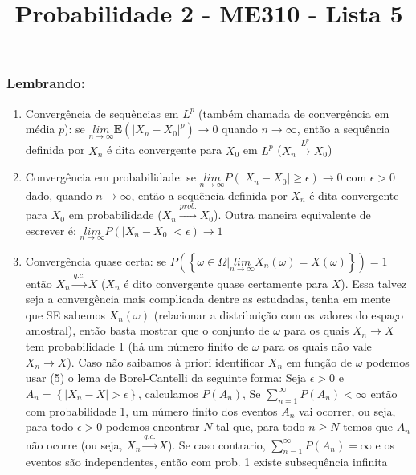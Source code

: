 \documentclass[portuguese]{article}
\begin{document}
\title{Probabilidade 2 - ME310 - Lista 5}

\maketitle

\subsubsection*{Lembrando:}
\begin{enumerate}
\item Convergência de sequências em $L^{p}$ (também chamada de convergência
em média $p$): se $\underset{n\rightarrow\infty}{lim}\mathbf{E}(\left|X_{n}-X_{0}\right|^{p})\rightarrow0$
quando $n\rightarrow\infty$, então a sequência definida por $X_{n}$
é dita convergente para $X_{0}$ em $L^{p}$ ($X_{n}\overset{L^{p}}{\rightarrow}X_{0}$)
\item Convergência em probabilidade: se $\underset{n\rightarrow\infty}{lim}P(\left|X_{n}-X_{0}\right|\ge\epsilon)\rightarrow0$
com $\epsilon>0$ dado, quando $n\rightarrow\infty$, então a sequência
definida por $X_{n}$ é dita convergente para $X_{0}$ em probabilidade
($X_{n}\overset{prob.}{\rightarrow}X_{0}$). Outra maneira equivalente
de escrever é: $\underset{n\rightarrow\infty}{lim}P(\left|X_{n}-X_{0}\right|<\epsilon)\rightarrow1$
\item Convergência quase certa: se $P(\left\{ \omega\in\Omega|\underset{n\rightarrow\infty}{lim}X_{n}\left(\omega\right)=X\left(\omega\right)\right\} )=1$
então $X_{n}\overset{q.c.}{\rightarrow}X$ ($X_{n}$ é dito convergente
quase certamente para $X$). Essa talvez seja a convergência mais
complicada dentre as estudadas, tenha em mente que SE sabemos $X_{n}(\omega)$
(relacionar a distribuição com os valores do espaço amostral), então
basta mostrar que o conjunto de $\omega$ para os quais $X_{n}\to X$
tem probabilidade 1 (há um número finito de $\omega$ para os quais
não vale $X_{n}\to X$). Caso não saibamos à priori identificar $X_{n}$
em função de $\omega$ podemos usar (5) o lema de Borel-Cantelli da
seguinte forma: Seja $\epsilon>0$ e $A_{n}=\left\{ |X_{n}-X|>\epsilon\right\} $,
calculamos $P(A_{n})$, Se $\sum_{n=1}^{\infty}P(A_{n})<\infty$ então
com probabilidade 1, um número finito dos eventos $A_{n}$ vai ocorrer,
ou seja, para todo $\epsilon>0$ podemos encontrar $N$ tal que, para
todo $n\ge N$ temos que $A_{n}$ não ocorre (ou seja, $X_{n}\overset{q.c.}{\to}X$).
Se caso contrario, $\sum_{n=1}^{\infty}P(A_{n})=\infty$ e os eventos
são independentes, então com prob. 1 existe subsequência infinita

\end{enumerate}
\end{document}
